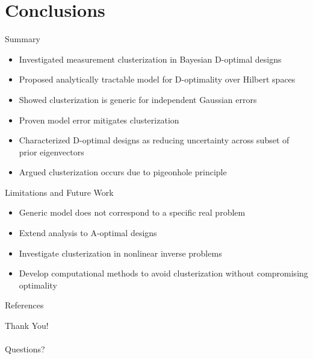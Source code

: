 \documentclass[aspectratio=169]{beamer}
\begin{document}
\section{Conclusions}

\begin{frame}{Summary}
\begin{itemize}
    \item Investigated measurement clusterization in Bayesian D-optimal designs
    \item Proposed analytically tractable model for D-optimality over Hilbert spaces
    \item Showed clusterization is generic for independent Gaussian errors
    \item Proven model error mitigates clusterization
    \item Characterized D-optimal designs as reducing uncertainty across subset of prior eigenvectors
    \item Argued clusterization occurs due to pigeonhole principle
\end{itemize}
\end{frame}

\begin{frame}{Limitations and Future Work}
\begin{itemize}
    \item Generic model does not correspond to a specific real problem
    \item Extend analysis to A-optimal designs
    \item Investigate clusterization in nonlinear inverse problems
    \item Develop computational methods to avoid clusterization without compromising optimality
\end{itemize}
\end{frame}

\begin{frame}{References}
\footnotesize


\end{frame}

\begin{frame}
\begin{center}
    {\huge Thank You!}\\~\\
    Questions?
\end{center}
\end{frame}
\end{document}
